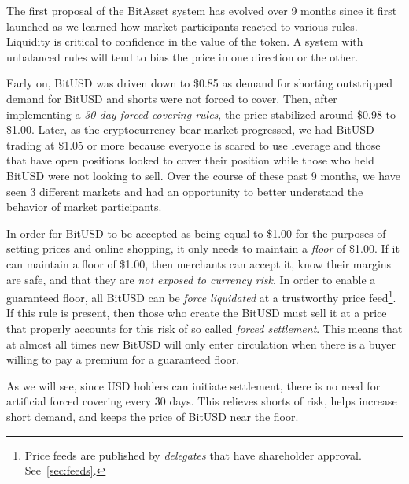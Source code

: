 The first proposal of the BitAsset system has evolved over 9 months since it
first launched as we learned how market participants reacted to various rules.
Liquidity is critical to confidence in the value of the token. A system with
unbalanced rules will tend to bias the price in one direction or the other.

Early on, BitUSD was driven down to \$0.85 as demand for shorting outstripped
demand for BitUSD and shorts were not forced to cover. Then, after implementing
a \emph{30 day forced covering rules}, the price stabilized around \$0.98 to
\$1.00. Later, as the cryptocurrency bear market progressed, we had BitUSD
trading at \$1.05 or more because everyone is scared to use leverage and those
that have open positions looked to cover their position while those who held
BitUSD were not looking to sell. Over the course of these past 9 months, we
have seen 3 different markets and had an opportunity to better understand the
behavior of market participants.

In order for BitUSD to be accepted as being equal to \$1.00 for the purposes of
setting prices and online shopping, it only needs to maintain a \emph{floor} of
\$1.00. If it can maintain a floor of \$1.00, then merchants can accept it,
know their margins are safe, and that they are \emph{not exposed to currency
risk}. In order to enable a guaranteed floor, all BitUSD can be \emph{force
liquidated} at a trustworthy price feed\footnote{Price feeds are published by
\emph{delegates} that have shareholder approval. See~\cref{sec:feeds}.}. If
this rule is present, then those who create the BitUSD must sell it at a price
that properly accounts for this risk of so called \emph{forced settlement}.
This means that at almost all times new BitUSD will only enter circulation when
there is a buyer willing to pay a premium for a guaranteed floor.

As we will see, since USD holders can initiate settlement, there is no need for
artificial forced covering every 30 days. This relieves shorts of risk, helps
increase short demand, and keeps the price of BitUSD near the floor.

